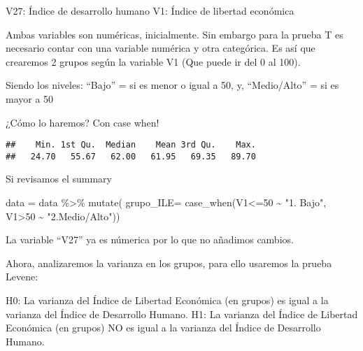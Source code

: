 \documentclass[
]{article}
\newenvironment{Shaded}{\begin{snugshade}}{\end{snugshade}}
\newcommand{\AttributeTok}[1]{\textcolor[rgb]{0.77,0.63,0.00}{#1}}
\newcommand{\DecValTok}[1]{\textcolor[rgb]{0.00,0.00,0.81}{#1}}
\newcommand{\FunctionTok}[1]{\textcolor[rgb]{0.00,0.00,0.00}{#1}}
\newcommand{\NormalTok}[1]{#1}
\newcommand{\OtherTok}[1]{\textcolor[rgb]{0.56,0.35,0.01}{#1}}
\newcommand{\SpecialCharTok}[1]{\textcolor[rgb]{0.00,0.00,0.00}{#1}}
\newcommand{\StringTok}[1]{\textcolor[rgb]{0.31,0.60,0.02}{#1}}
\begin{document}
V27: Índice de desarrollo humano V1: Índice de libertad económica

Ambas variables son numéricas, inicialmente. Sin embargo para la prueba
T es necesario contar con una variable numérica y otra categórica. Es
así que crearemos 2 grupos según la variable V1 (Que puede ir del 0 al
100).

Siendo los niveles: ``Bajo'' = si es menor o igual a 50, y,
``Medio/Alto'' = si es mayor a 50

¿Cómo lo haremos? Con case when!

\begin{Shaded}
\end{Shaded}

\begin{verbatim}
##    Min. 1st Qu.  Median    Mean 3rd Qu.    Max. 
##   24.70   55.67   62.00   61.95   69.35   89.70
\end{verbatim}

Si revisamos el summary

\begin{Shaded}
\begin{Highlighting}[]
\NormalTok{data }\OtherTok{=}\NormalTok{ data }\SpecialCharTok{\%\textgreater{}\%}
  \FunctionTok{mutate}\NormalTok{(}
   \AttributeTok{grupo\_ILE=} \FunctionTok{case\_when}\NormalTok{(V1}\SpecialCharTok{\textless{}=}\DecValTok{50} \SpecialCharTok{\textasciitilde{}} \StringTok{"1. Bajo"}\NormalTok{, V1}\SpecialCharTok{\textgreater{}}\DecValTok{50} \SpecialCharTok{\textasciitilde{}} \StringTok{"2.Medio/Alto"}\NormalTok{))}
\end{Highlighting}
\end{Shaded}

La variable ``V27'' ya es númerica por lo que no añadimos cambios.

Ahora, analizaremos la varianza en los grupos, para ello usaremos la
prueba Levene:

H0: La varianza del Índice de Libertad Económica (en grupos) es igual a
la varianza del Índice de Desarrollo Humano. H1: La varianza del Índice
de Libertad Económica (en grupos) NO es igual a la varianza del Índice
de Desarrollo Humano.

\begin{Shaded}
\end{Shaded}
\end{document}
